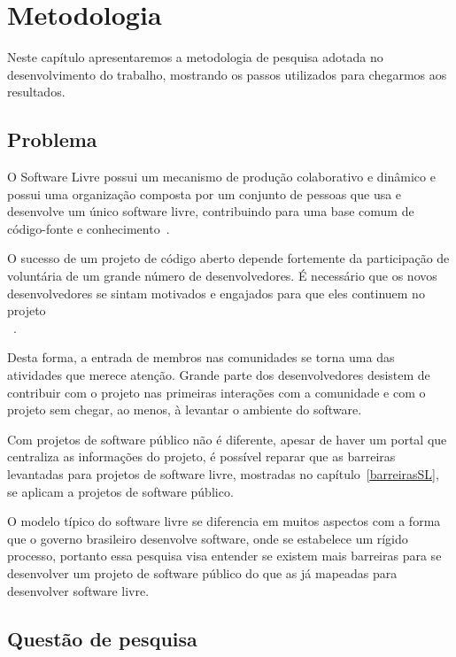\chapter{Metodologia}
\label{metodologia}

Neste capítulo apresentaremos a metodologia de pesquisa adotada no desenvolvimento 
do trabalho, mostrando os passos utilizados para chegarmos aos resultados.


\section{Problema}

O Software Livre possui um mecanismo de produção colaborativo e dinâmico 
e possui uma organização composta por um conjunto de pessoas que usa e desenvolve 
um único software livre, contribuindo para uma base comum de código-fonte e 
conhecimento~\cite{reis2003caracterizacc}.

O sucesso de um projeto de código aberto depende fortemente da participação de 
voluntária de um grande número de desenvolvedores. É necessário que os novos 
desenvolvedores se sintam motivados e engajados para que eles continuem no 
projeto\\~\cite{qureshi2010socialization}.

Desta forma, a entrada de membros nas comunidades se torna uma das atividades que
merece atenção. Grande parte dos desenvolvedores desistem de contribuir com o 
projeto nas primeiras interações com a comunidade e com o projeto sem chegar,
ao menos, à levantar o ambiente do software.

Com projetos de software público não é diferente, apesar de haver um portal que
centraliza as informações do projeto, é possível reparar que as barreiras levantadas
para projetos de software livre, mostradas no capítulo~\ref{barreirasSL}, se aplicam
a projetos de software público.

O modelo típico do software livre se diferencia em muitos aspectos 
com a forma que o governo brasileiro desenvolve software, onde se estabelece um 
rígido processo, portanto essa pesquisa visa entender se existem mais barreiras 
para se desenvolver um projeto de software público do que as já mapeadas para 
desenvolver software livre.



\section{Questão de pesquisa}

